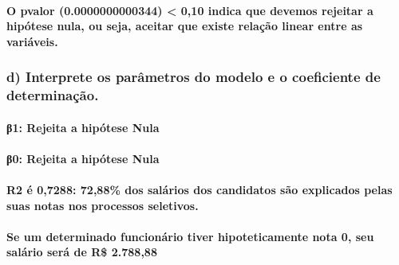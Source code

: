 \documentclass[
]{article}
\begin{document}
\hypertarget{o-pvalor-0.0000000000344-010-indica-que-devemos-rejeitar-a-hipuxf3tese-nula-ou-seja-aceitar-que-existe-relauxe7uxe3o-linear-entre-as-variuxe1veis.}{%
\paragraph{O pvalor (0.0000000000344) \textless{} 0,10 indica que
devemos rejeitar a hipótese nula, ou seja, aceitar que existe relação
linear entre as
variáveis.}\label{o-pvalor-0.0000000000344-010-indica-que-devemos-rejeitar-a-hipuxf3tese-nula-ou-seja-aceitar-que-existe-relauxe7uxe3o-linear-entre-as-variuxe1veis.}}

\hypertarget{d-interprete-os-paruxe2metros-do-modelo-e-o-coeficiente-de-determinauxe7uxe3o.}{%
\subsubsection{d) Interprete os parâmetros do modelo e o coeficiente de
determinação.}\label{d-interprete-os-paruxe2metros-do-modelo-e-o-coeficiente-de-determinauxe7uxe3o.}}

\hypertarget{ux3b21-rejeita-a-hipuxf3tese-nula}{%
\paragraph{β1: Rejeita a hipótese
Nula}\label{ux3b21-rejeita-a-hipuxf3tese-nula}}

\hypertarget{ux3b20-rejeita-a-hipuxf3tese-nula}{%
\paragraph{β0: Rejeita a hipótese
Nula}\label{ux3b20-rejeita-a-hipuxf3tese-nula}}

\hypertarget{r2-uxe9-07288-7288-dos-saluxe1rios-dos-candidatos-suxe3o-explicados-pelas-suas-notas-nos-processos-seletivos.}{%
\paragraph{R2 é 0,7288: 72,88\% dos salários dos candidatos são
explicados pelas suas notas nos processos
seletivos.}\label{r2-uxe9-07288-7288-dos-saluxe1rios-dos-candidatos-suxe3o-explicados-pelas-suas-notas-nos-processos-seletivos.}}

\hypertarget{se-um-determinado-funcionuxe1rio-tiver-hipoteticamente-nota-0-seu-saluxe1rio-seruxe1-de-r-2.78888}{%
\paragraph{Se um determinado funcionário tiver hipoteticamente nota 0,
seu salário será de R\$
2.788,88}\label{se-um-determinado-funcionuxe1rio-tiver-hipoteticamente-nota-0-seu-saluxe1rio-seruxe1-de-r-2.78888}}
\end{document}
